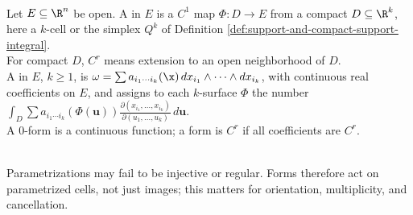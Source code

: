 \begin{definition} \label{def:forms-manifolds-core-source-todo}\label{def:k-surfaces-and-differential-forms} \\
Let $E\subseteq\R^n$ be open. A  in $E$ is a $C^1$ map $\Phi:D\to E$ from a compact  $D\subseteq\R^k$, here a $k$-cell or the simplex $Q^k$ of Definition \ref{def:support-and-compact-support-integral}.\\
For compact $D$, $C^r$ means extension to an open neighborhood of $D$.\\
A  in $E$, $k\geq1$, is $\omega=\sum a_{i_1\cdots i_k}(\x)\,dx_{i_1}\wedge\cdots\wedge dx_{i_k}$, with continuous real coefficients on $E$, and assigns to each $k$-surface $\Phi$ the number $\int_D \sum a_{i_1\cdots i_k}(\Phi(\mathbf{u})) \frac{\partial(x_{i_1},\ldots,x_{i_k})}{\partial(u_1,\ldots,u_k)}\,d\mathbf{u}$.\\
A $0$-form is a continuous function; a form is $C^r$ if all coefficients are $C^r$.
\end{definition}

\begin{remark} \label{rem:parametrized-cells-not-images} \\
Parametrizations may fail to be injective or regular. Forms therefore act on parametrized cells, not just images; this matters for orientation, multiplicity, and cancellation.
\end{remark}

